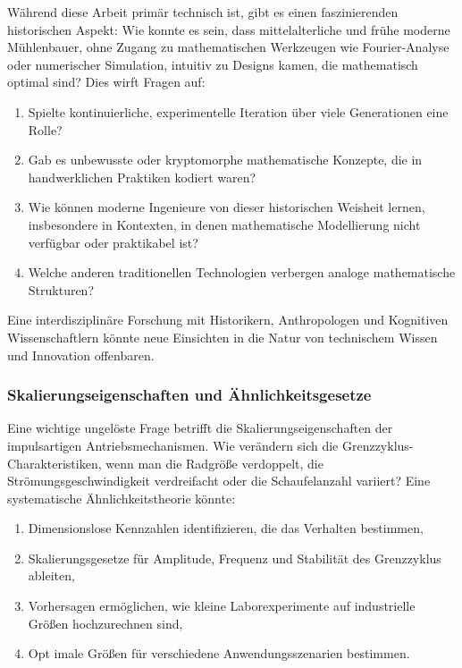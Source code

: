 \documentclass[a4paper,12pt]{article}
\theoremstyle{definition}
\begin{document}
Während diese Arbeit primär technisch ist, gibt es einen faszinierenden historischen Aspekt: Wie konnte es sein, dass mittelalterliche und frühe moderne Mühlenbauer, ohne Zugang zu mathematischen Werkzeugen wie Fourier-Analyse oder numerischer Simulation, intuitiv zu Designs kamen, die mathematisch optimal sind? Dies wirft Fragen auf:
\begin{enumerate}
  \item Spielte kontinuierliche, experimentelle Iteration über viele Generationen eine Rolle?
  \item Gab es unbewusste oder kryptomorphe mathematische Konzepte, die in handwerklichen Praktiken kodiert waren?
  \item Wie können moderne Ingenieure von dieser historischen Weisheit lernen, insbesondere in Kontexten, in denen mathematische Modellierung nicht verfügbar oder praktikabel ist?
  \item Welche anderen traditionellen Technologien verbergen analoge mathematische Strukturen?
\end{enumerate}

Eine interdisziplinäre Forschung mit Historikern, Anthropologen und Kognitiven Wissenschaftlern könnte neue Einsichten in die Natur von technischem Wissen und Innovation offenbaren.

\subsubsection*{Skalierungseigenschaften und Ähnlichkeitsgesetze}

Eine wichtige ungelöste Frage betrifft die Skalierungseigenschaften der impulsartigen Antriebsmechanismen. Wie verändern sich die Grenzzyklus-Charakteristiken, wenn man die Radgröße verdoppelt, die Strömungsgeschwindigkeit verdreifacht oder die Schaufelanzahl variiert? Eine systematische Ähnlichkeitstheorie könnte:
\begin{enumerate}
  \item Dimensionslose Kennzahlen identifizieren, die das Verhalten bestimmen,
  \item Skalierungsgesetze für Amplitude, Frequenz und Stabilität des Grenzzyklus ableiten,
  \item Vorhersagen ermöglichen, wie kleine Laborexperimente auf industrielle Größen hochzurechnen sind,
  \item Opt imale Größen für verschiedene Anwendungsszenarien bestimmen.
\end{enumerate}
\end{document}
